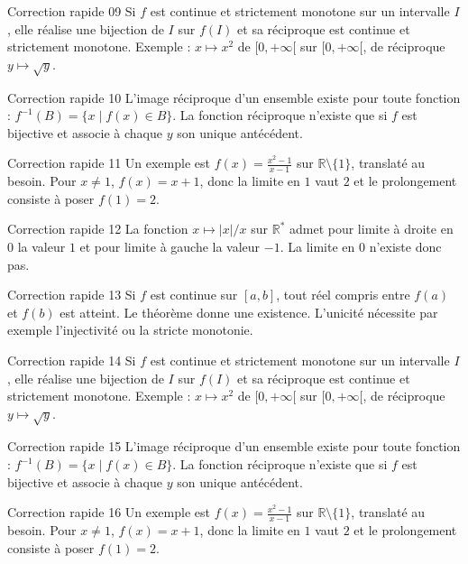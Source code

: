 \documentclass[11pt,a4paper]{article}
\newcommand{\R}{\mathbb{R}}
\begin{document}
\begin{corrbox}{Correction rapide 09}
Si $f$ est continue et strictement monotone sur un intervalle $I$, elle réalise une bijection de $I$ sur $f(I)$ et sa réciproque est continue et strictement monotone. Exemple : $x\mapsto x^2$ de $[0,+\infty[$ sur $[0,+\infty[$, de réciproque $y\mapsto\sqrt y$.
\end{corrbox}
\begin{corrbox}{Correction rapide 10}
L'image réciproque d'un ensemble existe pour toute fonction : $f^{-1}(B)=\{x\mid f(x)\in B\}$. La fonction réciproque n'existe que si $f$ est bijective et associe à chaque $y$ son unique antécédent.
\end{corrbox}
\begin{corrbox}{Correction rapide 11}
Un exemple est $f(x)=\frac{x^2-1}{x-1}$ sur $\R\setminus\{1\}$, translaté au besoin. Pour $x\neq1$, $f(x)=x+1$, donc la limite en $1$ vaut $2$ et le prolongement consiste à poser $f(1)=2$.
\end{corrbox}
\begin{corrbox}{Correction rapide 12}
La fonction $x\mapsto |x|/x$ sur $\R^*$ admet pour limite à droite en $0$ la valeur $1$ et pour limite à gauche la valeur $-1$. La limite en $0$ n'existe donc pas.
\end{corrbox}
\begin{corrbox}{Correction rapide 13}
Si $f$ est continue sur $[a,b]$, tout réel compris entre $f(a)$ et $f(b)$ est atteint. Le théorème donne une existence. L'unicité nécessite par exemple l'injectivité ou la stricte monotonie.
\end{corrbox}
\begin{corrbox}{Correction rapide 14}
Si $f$ est continue et strictement monotone sur un intervalle $I$, elle réalise une bijection de $I$ sur $f(I)$ et sa réciproque est continue et strictement monotone. Exemple : $x\mapsto x^2$ de $[0,+\infty[$ sur $[0,+\infty[$, de réciproque $y\mapsto\sqrt y$.
\end{corrbox}
\begin{corrbox}{Correction rapide 15}
L'image réciproque d'un ensemble existe pour toute fonction : $f^{-1}(B)=\{x\mid f(x)\in B\}$. La fonction réciproque n'existe que si $f$ est bijective et associe à chaque $y$ son unique antécédent.
\end{corrbox}
\begin{corrbox}{Correction rapide 16}
Un exemple est $f(x)=\frac{x^2-1}{x-1}$ sur $\R\setminus\{1\}$, translaté au besoin. Pour $x\neq1$, $f(x)=x+1$, donc la limite en $1$ vaut $2$ et le prolongement consiste à poser $f(1)=2$.
\end{corrbox}
\end{document}
